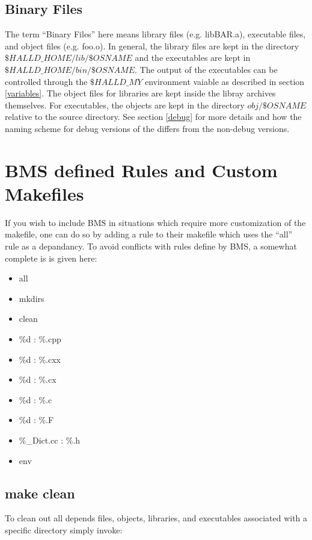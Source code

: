 \documentclass[12pt]{article}
\begin{document}
\subsection{Binary Files}
The term ``Binary Files'' here means library files (e.g. libBAR.a),
executable files, and object files (e.g. foo.o). In general, the 
library files are kept in the directory $\$HALLD\_HOME/lib/\$OSNAME$
and the executables are kept in $\$HALLD\_HOME/bin/\$OSNAME$. The
output of the executables can be controlled through the $\$HALLD\_MY$
environment vaiable as described in section \ref{variables}. The object
files for libraries are kept inside the libray archives themselves.
For executables, the objects are kept in the directory $obj/\$OSNAME$
relative to the source directory. See section \ref{debug} for more
details and how the naming scheme for debug versions of the differs
from the non-debug versions.

\section{BMS defined Rules and Custom Makefiles}
If you wish to include BMS in situations which require more customization
of the makefile, one can do so by adding a rule to their makefile
which uses the ``all'' rule as a depandancy. To avoid conflicts with
rules define by BMS, a somewhat complete is is given here:

\begin{itemize}
\item{all}
\item{mkdirs}
\item{clean}
\item{\%d : \%.cpp}
\item{\%d : \%.cxx}
\item{\%d : \%.cx}
\item{\%d : \%.c}
\item{\%d : \%.F}
\item{\%\_Dict.cc : \%.h}
\item{env}
\end{itemize}

\subsection{make clean}
To clean out all depends files, objects, libraries, and executables
associated with a specific directory simply invoke:
\end{document}
